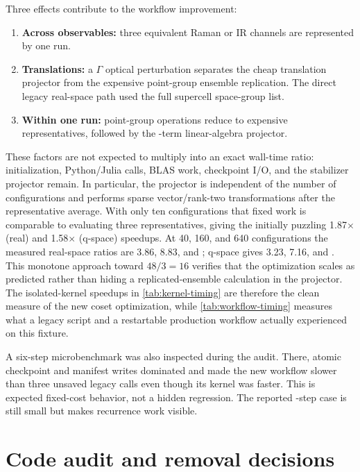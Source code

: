 \documentclass[11pt,a4paper]{article}
\begin{document}
Three effects contribute to the workflow improvement:
\begin{enumerate}
  \item \textbf{Across observables:} three equivalent Raman or IR channels are
        represented by one run.
  \item \textbf{Translations:} a $\Gamma$ optical perturbation separates the
        cheap translation projector from the expensive point-group ensemble
        replication.  The direct legacy real-space path used the full
        supercell space-group list.
  \item \textbf{Within one run:} \GroupOrder{} point-group operations reduce
        to \CosetCount{} expensive representatives, followed by the
        \StabilizerOrder-term linear-algebra projector.
\end{enumerate}
These factors are not expected to multiply into an exact wall-time ratio:
initialization, Python/Julia calls, BLAS work, checkpoint I/O, and the
stabilizer projector remain.  In particular, the projector is independent of
the number of configurations and performs \StabilizerOrder{} sparse
vector/rank-two transformations after the representative average.  With only
ten configurations that fixed work is comparable to evaluating three
representatives, giving the initially puzzling 1.87$\times$ (real) and
1.58$\times$ (q-space) speedups.  At 40, 160, and 640 configurations the
measured real-space ratios are 3.86, 8.83, and
\RealKernelSpeedup; q-space gives 3.23, 7.16, and
\QKernelSpeedup.  This monotone approach toward $48/3=16$ verifies that the
optimization scales as predicted rather than hiding a replicated-ensemble
calculation in the projector.  The isolated-kernel speedups in
\cref{tab:kernel-timing} are therefore the clean measure of the new coset
optimization, while \cref{tab:workflow-timing} measures what a legacy script
and a restartable production workflow actually experienced on this fixture.

A six-step microbenchmark was also inspected during the audit.  There, atomic
checkpoint and manifest writes dominated and made the new workflow slower
than three unsaved legacy calls even though its kernel was faster.  This is
expected fixed-cost behavior, not a hidden regression.  The reported
\BenchSteps-step case is still small but makes recurrence work visible.

\section{Code audit and removal decisions}
\label{sec:audit}
\end{document}
